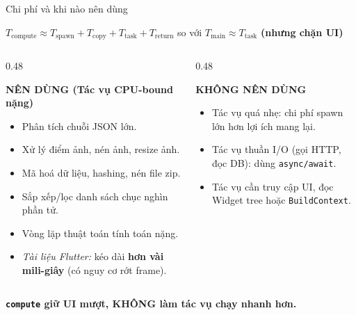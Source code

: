\documentclass[aspectratio=169,11pt]{beamer}
\begin{document}
\begin{frame}{Chi phí và khi nào nên dùng}
  \begin{center}
    {\normalsize $T_{\text{compute}} \approx T_{\text{spawn}} + T_{\text{copy}} + T_{\text{task}} + T_{\text{return}}$ \quad so với \quad $T_{\text{main}} \approx T_{\text{task}}$ \textbf{\color{redD}(nhưng chặn UI)}}
  \end{center}

  \vspace{0.1cm}
  \begin{columns}[T]
    \begin{column}{0.48\textwidth}
      \begin{block}{\scriptsize\bfseries NÊN DÙNG (Tác vụ CPU-bound nặng)}
        \scriptsize
        \begin{itemize}
          \setlength{\itemsep}{0.08cm}
          \item Phân tích chuỗi JSON lớn.
          \item Xử lý điểm ảnh, nén ảnh, resize ảnh.
          \item Mã hoá dữ liệu, hashing, nén file zip.
          \item Sắp xếp/lọc danh sách chục nghìn phần tử.
          \item Vòng lặp thuật toán tính toán nặng.
          \item \textit{Tài liệu Flutter:} kéo dài \textbf{hơn vài mili-giây} (có nguy cơ rớt frame).
        \end{itemize}
      \end{block}
    \end{column}
    \begin{column}{0.48\textwidth}
      \begin{alertblock}{\scriptsize\bfseries KHÔNG NÊN DÙNG}
        \scriptsize
        \begin{itemize}
          \setlength{\itemsep}{0.08cm}
          \item Tác vụ quá nhẹ: chi phí spawn lớn hơn lợi ích mang lại.
          \item Tác vụ thuần I/O (gọi HTTP, đọc DB): dùng \texttt{async/await}.
          \item Tác vụ cần truy cập UI, đọc Widget tree hoặc \texttt{BuildContext}.
        \end{itemize}
      \end{alertblock}
    \end{column}
  \end{columns}

  \vspace{0.15cm}
  \begin{center}
     \textbf{\footnotesize\texttt{compute} giữ UI mượt, KHÔNG làm tác vụ chạy nhanh hơn.}
  \end{center}
\end{frame}
\end{document}
